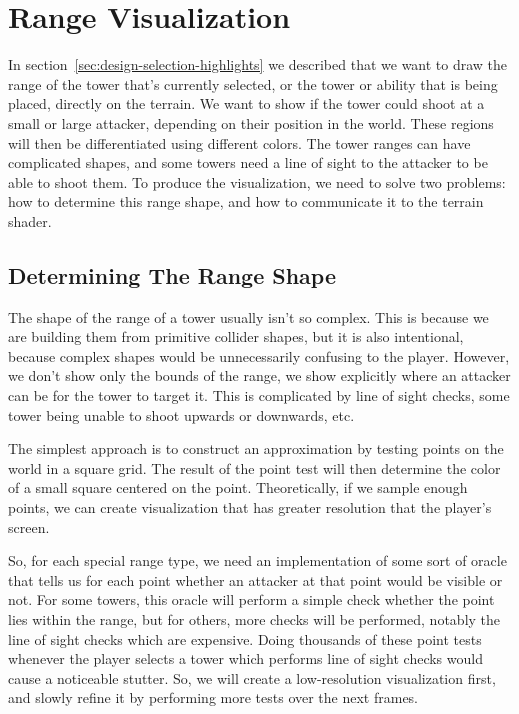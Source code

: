 \section{Range Visualization}

In section~\ref{sec:design-selection-highlights} we described that we want to draw the range of the tower that's currently selected, or the tower or ability that is being placed, directly on the terrain.
We want to show if the tower could shoot at a small or large attacker, depending on their position in the world.
These regions will then be differentiated using different colors.
The tower ranges can have complicated shapes, and some towers need a line of sight to the attacker to be able to shoot them.
To produce the visualization, we need to solve two problems: how to determine this range shape, and how to communicate it to the terrain shader.

\subsection{Determining The Range Shape}

The shape of the range of a tower usually isn't so complex.
This is because we are building them from primitive collider shapes, but it is also intentional, because complex shapes would be unnecessarily confusing to the player.
However, we don't show only the bounds of the range, we show explicitly where an attacker can be for the tower to target it.
This is complicated by line of sight checks, some tower being unable to shoot upwards or downwards, etc.

The simplest approach is to construct an approximation by testing points on the world in a square grid.
The result of the point test will then determine the color of a small square centered on the point.
Theoretically, if we sample enough points, we can create visualization that has greater resolution that the player's screen.

So, for each special range type, we need an implementation of some sort of oracle that tells us for each point whether an attacker at that point would be visible or not.
For some towers, this oracle will perform a simple check whether the point lies within the range, but for others, more checks will be performed, notably the line of sight checks which are expensive.
Doing thousands of these point tests whenever the player selects a tower which performs line of sight checks would cause a noticeable stutter.
So, we will create a low-resolution visualization first, and slowly refine it by performing more tests over the next frames.

